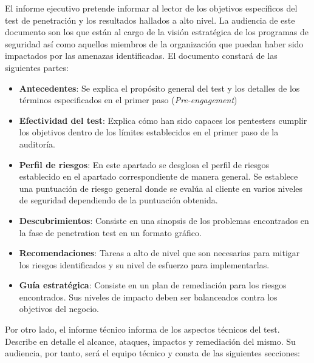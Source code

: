 \documentclass[a4paper,oneside]{article}
\begin{document}
El informe ejecutivo pretende informar al lector de los objetivos específicos del test de penetración y los resultados hallados a alto nivel. La audiencia de este documento son los que están al cargo de la visión estratégica de los programas de seguridad así como aquellos miembros de la organización que puedan haber sido impactados por las amenazas identificadas. El documento constará de las siguientes partes:

\begin{itemize}
\item \textbf{Antecedentes}: Se explica el propósito general del test y los detalles de los términos especificados en el primer paso (\textit{Pre-engagement})
\item \textbf{Efectividad del test}: Explica cómo han sido capaces los pentesters cumplir los objetivos dentro de los límites establecidos en el primer paso de la auditoría.
\item \textbf{Perfil de riesgos}: En este apartado se desglosa el perfil de riesgos establecido en el apartado correspondiente de manera general. Se establece una puntuación de riesgo general donde se evalúa al cliente en varios niveles de seguridad dependiendo de la puntuación obtenida.
\item \textbf{Descubrimientos}: Consiste en una sinopsis de los problemas encontrados en la fase de penetration test en un formato gráfico.
\item \textbf{Recomendaciones}: Tareas a alto de nivel que son necesarias para mitigar los riesgos identificados y su nivel de esfuerzo para implementarlas.
\item \textbf{Guía estratégica}: Consiste en un plan de remediación para los riesgos encontrados. Sus niveles de impacto deben ser balanceados contra los objetivos del negocio.
\end{itemize}

Por otro lado, el informe técnico informa de los aspectos técnicos del test. Describe en detalle el alcance, ataques, impactos y remediación del mismo. Su audiencia, por tanto, será el equipo técnico y consta de las siguientes secciones:
\end{document}
